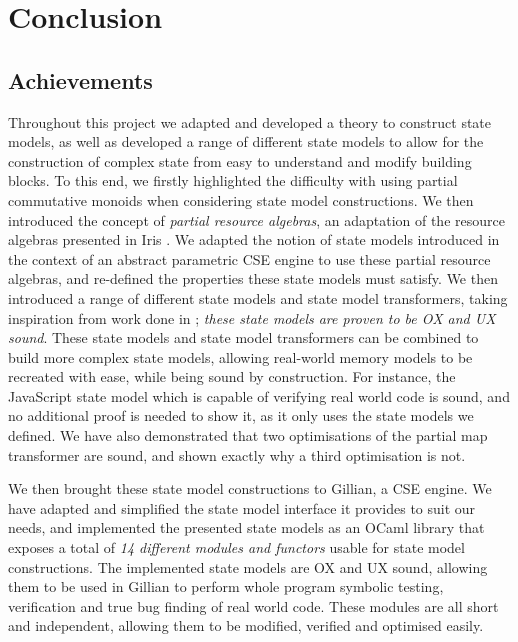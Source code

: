 \chapter{Conclusion} \label{chap:conclusion}

\section{Achievements}

Throughout this project we adapted and developed a theory to construct state models, as well as developed a range of different state models to allow for the construction of complex state from easy to understand and modify building blocks. To this end, we firstly highlighted the difficulty with using partial commutative monoids when considering state model constructions. We then introduced the concept of \emph{partial resource algebras}, an adaptation of the resource algebras presented in Iris \cite{iris}. We adapted the notion of state models introduced in the context of an abstract parametric CSE engine \cite{cse2} to use these partial resource algebras, and re-defined the properties these state models must satisfy. We then introduced a range of different state models and state model transformers, taking inspiration from work done in \cite{iris,sacha-phd}; \emph{these state models are proven to be OX and UX sound}. These state models and state model transformers can be combined to build more complex state models, allowing real-world memory models to be recreated with ease, while being sound by construction. For instance, the JavaScript state model which is capable of verifying real world code is sound, and no additional proof is needed to show it, as it only uses the state models we defined. We have also demonstrated that two optimisations of the partial map transformer are sound, and shown exactly why a third optimisation is not.

We then brought these state model constructions to Gillian, a CSE engine. We have adapted and simplified the state model interface it provides to suit our needs, and implemented the presented state models as an OCaml library that exposes a total of \emph{14 different modules and functors} usable for state model constructions. The implemented state models are OX and UX sound, allowing them to be used in Gillian to perform whole program symbolic testing, verification and true bug finding of real world code. These modules are all short and independent, allowing them to be modified, verified and optimised easily.


